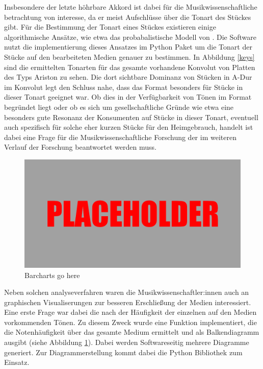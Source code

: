 Insbesondere der letzte höhrbare Akkord ist dabei für die Musikwissenschaftliche betrachtung von interesse, da er meist Aufschlüsse über die Tonart des Stückes gibt.
Für die Bestimmung der Tonart eines Stückes existieren einige algorithmische Ansätze, wie etwa das probabalistische Modell von \textcite[]{temperley_2002}.
Die  Software nutzt die implementierung dieses Ansatzes im Python Paket  \parencite[]{music21} um die Tonart der Stücke auf den bearbeiteten Medien genauer zu bestimmen.
In Abbildung \ref{keys} sind die ermittelten Tonarten für das gesamte vorhandene Konvolut von Platten des Typs Ariston zu sehen.
Die dort sichtbare Dominanz von Stücken in A-Dur im Konvolut legt den Schluss nahe, dass das Format besonders für Stücke in dieser Tonart geeignet war.
Ob dies in der Verfügbarkeit von Tönen im Format begründet liegt oder ob es sich um gesellschaftliche Gründe wie etwa eine besonders gute Resonanz der Konsumenten auf Stücke in dieser Tonart, eventuell auch spezifisch für solche eher kurzen Stücke für den Heimgebrauch, handelt ist dabei eine Frage für die Musikwissenschaftliche Forschung der im weiteren Verlauf der Forschung beantwortet werden muss.

\begin{figure}[t]
    \centering
    \includegraphics[width=\textwidth]{graphics/placeholder.png}
    \caption{Barcharts go here}
    \label{barcharts}
\end{figure}

Neben solchen analyseverfahren waren die Musikwissenschaftler:innen auch an graphischen Visualiserungen zur besseren Erschließung der Medien interessiert.
Eine erste Frage war dabei die nach der Häufigkeit der einzelnen auf den Medien vorkommenden Tönen.
Zu diesem Zweck wurde eine Funktion implementiert, die die Notenhäufigkeit über das gesamte Medium ermittelt und als Balkendiagramm ausgibt (siehe Abbildung \ref{barcharts}).
Dabei werden Softwareseitig mehrere Diagramme generiert.
Zur Diagrammerstellung kommt dabei die Python Bibliothek  \parencite[]{Hunter_2007} zum Einsatz.

